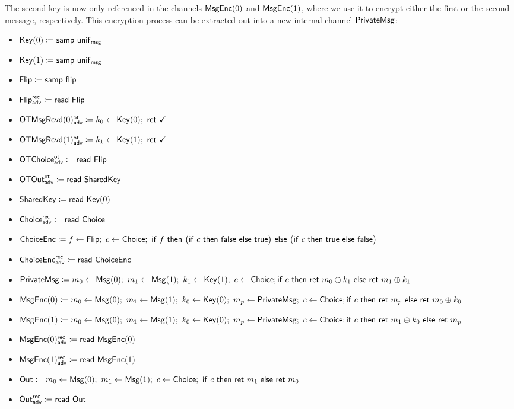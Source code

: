 \noindent The second key is now only referenced in the channels $\mathsf{MsgEnc}(0)$ and $\mathsf{MsgEnc}(1)$, where we use it to encrypt either the first or the second message, respectively. This encryption process can be extracted out into a new internal channel $\mathsf{PrivateMsg}$:

\begin{itemize}
\item $\mathsf{Key}(0) \coloneqq \mathsf{samp} \ \mathsf{unif}_{\mathsf{msg}}$
\item $\mathsf{Key}(1) \coloneqq \mathsf{samp} \ \mathsf{unif}_{\mathsf{msg}}$
\item $\mathsf{Flip} \coloneqq \mathsf{samp} \ \mathsf{flip}$
\item {\color{blue} $\mathsf{Flip}^{\mathsf{rec}}_{\mathsf{adv}} \coloneqq \mathsf{read} \ \mathsf{Flip}$}
\item {\color{blue} $\LeakOTMsgRcvd(0)^\ot_\adv \coloneqq k_0 \leftarrow \Key(0); \ \ret{\checkmark}$}
\item {\color{blue} $\LeakOTMsgRcvd(1)^\ot_\adv \coloneqq k_1 \leftarrow \Key(1); \ \ret{\checkmark}$}
\item {\color{blue} $\mathsf{OTChoice}^{\mathsf{ot}}_{\mathsf{adv}} \coloneqq \mathsf{read} \ \mathsf{Flip}$}
\item {\color{blue} $\mathsf{OTOut}^{\mathsf{ot}}_{\mathsf{adv}} \coloneqq \mathsf{read} \ \mathsf{SharedKey}$}
\item $\mathsf{SharedKey} \coloneqq \mathsf{read} \ \mathsf{Key}(0)$
\item {\color{blue} $\mathsf{Choice}^{\mathsf{rec}}_{\mathsf{adv}} \coloneqq \mathsf{read} \ \mathsf{Choice}$}
\item $\ChoiceEnc \coloneqq f \leftarrow \Flip; \ c \leftarrow \Choice; \ \ifte{f}{\big(\ifte{c}{\false}{\true}\big)}{\big(\ifte{c}{\true}{\false}\big)}$
\item {\color{blue} $\mathsf{ChoiceEnc}^{\mathsf{rec}}_{\mathsf{adv}} \coloneqq \mathsf{read} \ \mathsf{ChoiceEnc}$}
\item {\color{red} $\mathsf{PrivateMsg} \coloneqq m_0 \leftarrow \mathsf{Msg}(0); \ m_1 \leftarrow \mathsf{Msg}(1); \ k_1 \leftarrow \mathsf{Key}(1); \ c \leftarrow \mathsf{Choice}; \\ \mathsf{if} \ c \ \mathsf{then} \ \mathsf{ret} \ m_0 \oplus k_1 \ \mathsf{else} \ \mathsf{ret} \ m_1 \oplus k_1$}
\item {\color{red} $\mathsf{MsgEnc}(0) \coloneqq m_0 \leftarrow \mathsf{Msg}(0); \ m_1 \leftarrow \mathsf{Msg}(1); \ k_0 \leftarrow \mathsf{Key}(0); \ m_p \leftarrow \mathsf{PrivateMsg}; \ c \leftarrow \mathsf{Choice}; \\ \mathsf{if} \ c \ \mathsf{then} \ \mathsf{ret} \ m_p \ \mathsf{else} \ \mathsf{ret} \ m_0 \oplus k_0$}
\item {\color{red} $\mathsf{MsgEnc}(1) \coloneqq m_0 \leftarrow \mathsf{Msg}(0); \ m_1 \leftarrow \mathsf{Msg}(1); \ k_0 \leftarrow \mathsf{Key}(0); \ m_p \leftarrow \mathsf{PrivateMsg}; \ c \leftarrow \mathsf{Choice}; \\ \mathsf{if} \ c \ \mathsf{then} \ \mathsf{ret} \ m_1 \oplus k_0 \ \mathsf{else} \ \mathsf{ret} \ m_p$}
\item {\color{blue} $\mathsf{MsgEnc}(0)^{\mathsf{rec}}_{\mathsf{adv}} \coloneqq \mathsf{read} \ \mathsf{MsgEnc}(0)$}
\item {\color{blue} $\mathsf{MsgEnc}(1)^{\mathsf{rec}}_{\mathsf{adv}} \coloneqq \mathsf{read} \ \mathsf{MsgEnc}(1)$}
\item $\Out \coloneqq m_0 \leftarrow \Msg(0); \ m_1 \leftarrow \Msg(1); \ c \leftarrow \Choice; \ \ifte{c}{\ret{m_1}}{\ret{m_0}}$
\item {\color{blue} $\mathsf{Out}^{\mathsf{rec}}_{\mathsf{adv}} \coloneqq \mathsf{read} \ \mathsf{Out}$}
\end{itemize}

